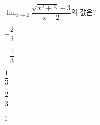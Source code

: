$\displaystyle\lim_{x\to 2}\dfrac{\sqrt{x^2+5}-3}{x-2}$의 값은?
\begin{choices32}{\rule[-3ex]{0pt}{8ex}$-\dfrac{2}{3}$}{\rule[-3ex]{0pt}{8ex}$-\dfrac{1}{3}$}{\rule[-3ex]{0pt}{8ex}$\dfrac{1}{3}$}{\rule[-3ex]{0pt}{8ex}$\dfrac{2}{3}$}{\rule[-3ex]{0pt}{8ex}$1$}\end{choices32}
